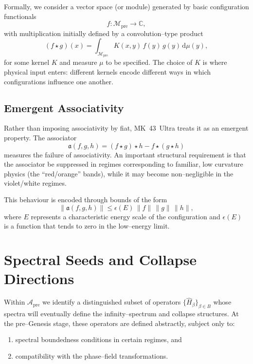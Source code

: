 Formally, we consider a vector space (or module) generated by basic
configuration functionals
\begin{equation}
  f : \mathcal{M}_\mathrm{pre} \to \mathbb{C},
\end{equation}
with multiplication initially defined by a convolution--type product
\begin{equation}
  (f \star g)(x)
  = \int_{\mathcal{M}_\mathrm{pre}} K(x,y)\, f(y)\, g(y)\, \mathrm{d}\mu(y),
\end{equation}
for some kernel $K$ and measure $\mu$ to be specified. The choice of $K$ is
where physical input enters: different kernels encode different ways in which
configurations influence one another.

\subsection{Emergent Associativity}
Rather than imposing associativity by fiat, MK~43~Ultra treats it as an
emergent property. The associator
\begin{equation}
  \mathfrak{a}(f,g,h) = (f \star g) \star h - f \star (g \star h)
\end{equation}
measures the failure of associativity. An important structural requirement is
that the associator be suppressed in regimes corresponding to familiar, low
curvature physics (the ``red/orange'' bands), while it may become non--negligible
in the violet/white regimes.

This behaviour is encoded through bounds of the form
\begin{equation}
  \|\mathfrak{a}(f,g,h)\| \leq \epsilon(E)\, \|f\|\,\|g\|\,\|h\|,
\end{equation}
where $E$ represents a characteristic energy scale of the configuration and
$\epsilon(E)$ is a function that tends to zero in the low--energy limit.

\section{Spectral Seeds and Collapse Directions}
Within $\mathcal{A}_\mathrm{pre}$ we identify a distinguished subset of
operators $\{\hat{H}_\beta\}_{\beta \in B}$ whose spectra will eventually
define the infinity--spectrum and collapse structures. At the pre--Genesis
stage, these operators are defined abstractly, subject only to:
\begin{enumerate}
  \item spectral boundedness conditions in certain regimes, and
  \item compatibility with the phase--field transformations.
\end{enumerate}

